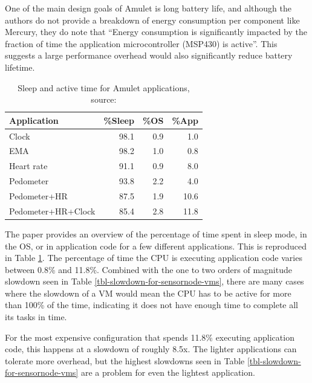 One of the main design goals of Amulet is long battery life, and although the authors do not provide a breakdown of energy consumption per component like Mercury, they do note that “Energy consumption is significantly impacted by the fraction of time the application microcontroller (MSP430) is active”. This suggests a large performance overhead would also significantly reduce battery lifetime.

\begin{table}
\caption[Sleep and active time for Amulet applications]{Sleep and active time for Amulet applications, source: \cite{Hester:2016je}}
\label{tbl-amulet-applications-sleep}
    \begin{tabular}{lrrr} %
        \toprule
        Application        & \%Sleep & \%OS & \%App \\
        \midrule
        \midrule
        Clock              & 98.1    & 0.9  & 1.0 \\
        EMA                & 98.2    & 1.0  & 0.8 \\
        Heart rate         & 91.1    & 0.9  & 8.0 \\
        Pedometer          & 93.8    & 2.2  & 4.0 \\
        Pedometer+HR       & 87.5    & 1.9  & 10.6 \\
        Pedometer+HR+Clock & 85.4    & 2.8  & 11.8 \\
        \bottomrule
    \end{tabular}
\end{table}

The paper provides an overview of the percentage of time spent in sleep mode, in the OS, or in application code for a few different applications. This is reproduced in Table \ref{tbl-amulet-applications-sleep}. The percentage of time the CPU is executing application code varies between 0.8\% and 11.8\%. Combined with the one to two orders of magnitude slowdown seen in Table \ref{tbl-slowdown-for-sensornode-vms}, there are many cases where the slowdown of a VM would mean the CPU has to be active for more than 100\% of the time, indicating it does not have enough time to complete all its tasks in time.

For the most expensive configuration that spends 11.8\% executing application code, this happens at a slowdown of roughly 8.5x. The lighter applications can tolerate more overhead, but the highest slowdowns seen in Table \ref{tbl-slowdown-for-sensornode-vms} are a problem for even the lightest application.

